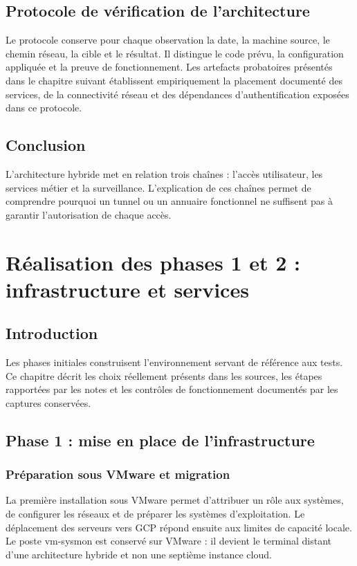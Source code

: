 \documentclass[a4paper,12pt]{report}
\begin{document}
\section{Protocole de vérification de l'architecture}
Le protocole conserve pour chaque observation la date, la machine source, le chemin réseau, la cible et le résultat. Il distingue le code prévu, la configuration appliquée et la preuve de fonctionnement. Les artefacts probatoires présentés dans le chapitre suivant établissent empiriquement la placement documenté des services, de la connectivité réseau et des dépendances d'authentification exposées dans ce protocole.

\section*{Conclusion}
L'architecture hybride met en relation trois chaînes : l'accès utilisateur, les services métier et la surveillance. L'explication de ces chaînes permet de comprendre pourquoi un tunnel ou un annuaire fonctionnel ne suffisent pas à garantir l'autorisation de chaque accès.

\chapter{Réalisation des phases 1 et 2 : infrastructure et services}
\section*{Introduction}
Les phases initiales construisent l'environnement servant de référence aux tests. Ce chapitre décrit les choix réellement présents dans les sources, les étapes rapportées par les notes et les contrôles de fonctionnement documentés par les captures conservées.

\section{Phase 1 : mise en place de l'infrastructure}
\subsection{Préparation sous VMware et migration}
La première installation sous VMware permet d'attribuer un rôle aux systèmes, de configurer les réseaux et de préparer les systèmes d'exploitation. Le déplacement des serveurs vers GCP répond ensuite aux limites de capacité locale. Le poste vm-sysmon est conservé sur VMware : il devient le terminal distant d'une architecture hybride et non une septième instance cloud.
\end{document}
